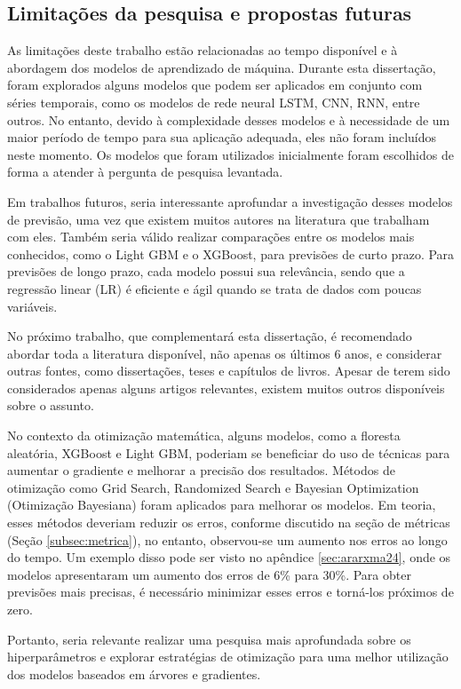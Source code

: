\subsection{Limita\c c\~oes da pesquisa e propostas futuras}

As limitações deste trabalho estão relacionadas ao tempo disponível e à abordagem dos modelos de aprendizado de máquina. Durante esta dissertação, foram explorados alguns modelos que podem ser aplicados em conjunto com séries temporais, como os modelos de rede neural LSTM, CNN, RNN, entre outros. No entanto, devido à complexidade desses modelos e à necessidade de um maior período de tempo para sua aplicação adequada, eles não foram incluídos neste momento. Os modelos que foram utilizados inicialmente foram escolhidos de forma a atender à pergunta de pesquisa levantada.

Em trabalhos futuros, seria interessante aprofundar a investigação desses modelos de previsão, uma vez que existem muitos autores na literatura que trabalham com eles. Também seria válido realizar comparações entre os modelos mais conhecidos, como o Light GBM e o XGBoost, para previsões de curto prazo. Para previsões de longo prazo, cada modelo possui sua relevância, sendo que a regressão linear (LR) é eficiente e ágil quando se trata de dados com poucas variáveis.

No próximo trabalho, que complementará esta dissertação, é recomendado abordar toda a literatura disponível, não apenas os últimos 6 anos, e considerar outras fontes, como dissertações, teses e capítulos de livros. Apesar de terem sido considerados apenas alguns artigos relevantes, existem muitos outros disponíveis sobre o assunto.

No contexto da otimização matemática, alguns modelos, como a floresta aleatória, XGBoost e Light GBM, poderiam se beneficiar do uso de técnicas para aumentar o gradiente e melhorar a precisão dos resultados. Métodos de otimização como Grid Search, Randomized Search e Bayesian Optimization (Otimização Bayesiana) foram aplicados para melhorar os modelos. Em teoria, esses métodos deveriam reduzir os erros, conforme discutido na seção de métricas (Seção \ref{subsec:metrica}), no entanto, observou-se um aumento nos erros ao longo do tempo. Um exemplo disso pode ser visto no apêndice \ref{sec:ararxma24}, onde os modelos apresentaram um aumento dos erros de 6\% para 30\%. Para obter previsões mais precisas, é necessário minimizar esses erros e torná-los próximos de zero.

Portanto, seria relevante realizar uma pesquisa mais aprofundada sobre os hiperparâmetros e explorar estratégias de otimização para uma melhor utilização dos modelos baseados em árvores e gradientes.